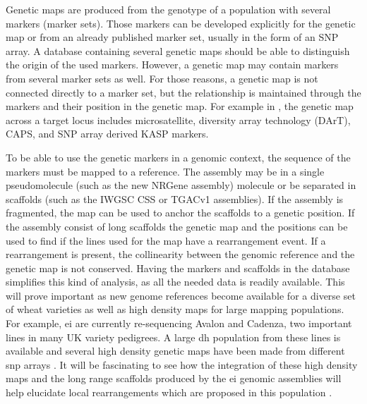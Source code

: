 Genetic maps are produced from the genotype of a population with several markers (marker sets). 
Those markers can be developed explicitly for the genetic map or from an already published marker set, usually in the form of an SNP array. 
A database containing several genetic maps should be able to distinguish the origin of the used markers.
However, a genetic map may contain markers from several marker sets as well.
For those reasons, a genetic map is not connected directly to a marker set, but the relationship is maintained through the markers and their position in the genetic map.
For example in \citet{Simmonds2014}, the genetic map across a target locus includes microsatellite, diversity array technology (DArT), CAPS, and SNP array derived KASP markers. 

To be able to use the genetic markers in a genomic context, the sequence of the markers must be mapped to a reference. 
The assembly may be in a single pseudomolecule (such as the new NRGene assembly) molecule or be separated in scaffolds (such as the IWGSC CSS or TGACv1 assemblies). 
If the assembly is fragmented, the  map can be used to anchor the scaffolds to a genetic position. 
If the assembly consist of long scaffolds the genetic map and the positions can be used to find if the lines used for the map have a rearrangement event. 
If a rearrangement is present, the collinearity between the genomic reference and the genetic map is not conserved. 
Having the markers and scaffolds in the database simplifies this kind of analysis, as all the needed data is readily available. 
This will prove important as new genome references become available for a diverse set of wheat varieties as well as high density maps for large mapping populations. 
For example, \gls{ei} are currently re-sequencing Avalon and Cadenza, two important lines in many UK variety pedigrees. 
A large \gls{dh} population from these lines is available and several high density genetic maps have been made from different \gls{snp} arrays \citep{Winfield2016,Allen2016}. 
It will be fascinating to see how the integration of these high density maps and the long range scaffolds produced by the \gls{ei} genomic assemblies will help elucidate local rearrangements which are proposed in this population \citep{Allen2016}.

